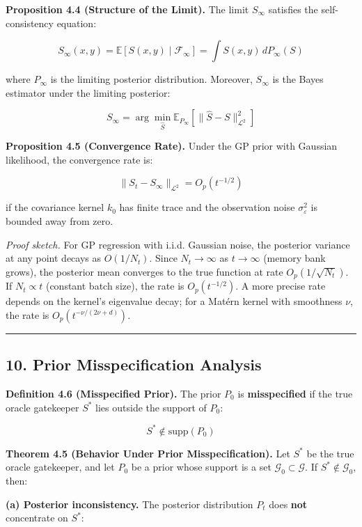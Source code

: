 \documentclass[
  12pt,
]{article}
\begin{document}
\textbf{Proposition 4.4 (Structure of the Limit).} The limit
\(S_\infty\) satisfies the self-consistency equation:

\[
S_\infty(x,y) = \mathbb{E}[S(x,y) \mid \mathcal{F}_\infty] = \int S(x,y) \, dP_\infty(S)
\]

where \(P_\infty\) is the limiting posterior distribution. Moreover,
\(S_\infty\) is the Bayes estimator under the limiting posterior:

\[
S_\infty = \arg\min_{\hat{S}} \mathbb{E}_{P_\infty}[\|\hat{S} - S\|^2_{\mathcal{L}^2}]
\]

\textbf{Proposition 4.5 (Convergence Rate).} Under the GP prior with
Gaussian likelihood, the convergence rate is:

\[
\|S_t - S_\infty\|_{\mathcal{L}^2} = O_p(t^{-1/2})
\]

if the covariance kernel \(k_0\) has finite trace and the observation
noise \(\sigma^2_\varepsilon\) is bounded away from zero.

\emph{Proof sketch.} For GP regression with i.i.d. Gaussian noise, the
posterior variance at any point decays as \(O(1/N_t)\). Since
\(N_t \to \infty\) as \(t \to \infty\) (memory bank grows), the
posterior mean converges to the true function at rate
\(O_p(1/\sqrt{N_t})\). If \(N_t \propto t\) (constant batch size), the
rate is \(O_p(t^{-1/2})\). A more precise rate depends on the kernel's
eigenvalue decay; for a Matérn kernel with smoothness \(\nu\), the rate
is \(O_p(t^{-\nu/(2\nu+d)})\).

\begin{center}\rule{0.5\linewidth}{0.5pt}\end{center}

\subsection{10. Prior Misspecification
Analysis}\label{prior-misspecification-analysis}

\textbf{Definition 4.6 (Misspecified Prior).} The prior \(P_0\) is
\textbf{misspecified} if the true oracle gatekeeper \(S^*\) lies outside
the support of \(P_0\):

\[
S^* \notin \text{supp}(P_0)
\]

\textbf{Theorem 4.5 (Behavior Under Prior Misspecification).} Let
\(S^*\) be the true oracle gatekeeper, and let \(P_0\) be a prior whose
support is a set \(\mathcal{G}_0 \subset \mathcal{G}\). If
\(S^* \notin \mathcal{G}_0\), then:

\textbf{(a) Posterior inconsistency.} The posterior distribution \(P_t\)
does \textbf{not} concentrate on \(S^*\):
\end{document}
